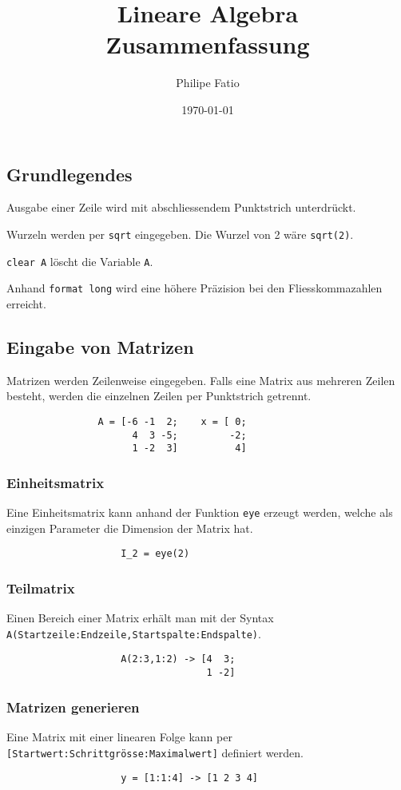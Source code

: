 \documentclass[10pt]{article}
\author{Philipe Fatio}
\title{Lineare Algebra \\ Zusammenfassung}
\date{\today}
\begin{document}
	\begin{multicols*}{3}
		\section*{Grundlegendes} %
			Ausgabe einer Zeile wird mit abschliessendem Punktstrich unterdrückt.
			
			Wurzeln werden per \verb+sqrt+ eingegeben. Die Wurzel von 2 wäre \verb+sqrt(2)+.
			
			\verb+clear A+ löscht die Variable \verb+A+.
			
			Anhand \verb+format long+ wird eine höhere Präzision bei den Fliesskommazahlen erreicht.
		\subsection*{Eingabe von Matrizen} %
			Matrizen werden Zeilenweise eingegeben. Falls eine Matrix aus mehreren Zeilen besteht, werden die einzelnen Zeilen per Punktstrich getrennt.
			
			\begin{verbatim}
				A = [-6 -1  2;    x = [ 0;
				      4  3 -5;         -2;
				      1 -2  3]          4]
			\end{verbatim}
			\subsubsection*{Einheitsmatrix} %
				Eine Einheitsmatrix kann anhand der Funktion \verb+eye+ erzeugt werden, welche als einzigen Parameter die Dimension der Matrix hat.
				\begin{verbatim}
					I_2 = eye(2)
				\end{verbatim}
			\subsubsection*{Teilmatrix} %
				Einen Bereich einer Matrix erhält man mit der Syntax \verb+A(Startzeile:Endzeile,Startspalte:Endspalte)+.
				\begin{verbatim}
					A(2:3,1:2) -> [4  3;
					               1 -2]
				\end{verbatim}
			\subsubsection*{Matrizen generieren} %
				Eine Matrix mit einer linearen Folge kann per \verb+[Startwert:Schrittgrösse:Maximalwert]+  definiert werden.
				\begin{verbatim}
					y = [1:1:4] -> [1 2 3 4]
				\end{verbatim}

\end{multicols*}
\end{document}
